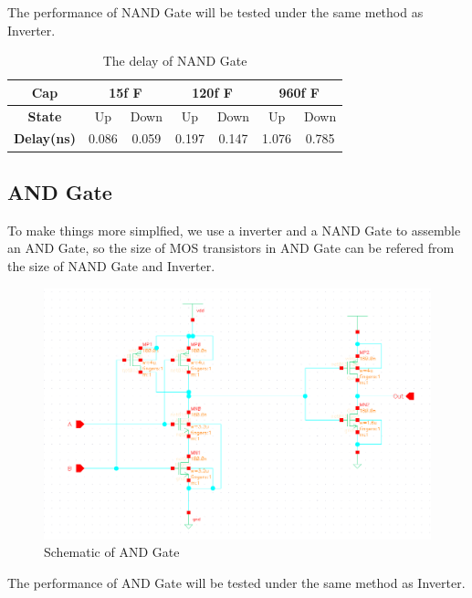 \documentclass[conference]{IEEEtran}
\begin{document}
The performance of NAND Gate will be tested under the same method as Inverter.

\begin{table}[h]
    \caption{The delay of NAND Gate}
    \begin{center}
        \begin{tabular}{|c|c|c|c|c|c|c|}
            \hline
            \textbf{Cap} & \multicolumn{2}{|c|}{15f F} & \multicolumn{2}{|c|}{120f F} & \multicolumn{2}{|c|}{960f F} \\
            \hline
            \textbf{State} & Up & Down & Up & Down & Up & Down \\
            \hline
            \textbf{Delay(ns)} & 0.086 & 0.059 & 0.197 & 0.147 & 1.076 & 0.785 \\
            \hline
        \end{tabular}
    \end{center}
    \label{The delay of NAND}
\end{table}

\subsection{AND Gate}

To make things more simplfied, we use a inverter and a NAND Gate to assemble an AND Gate, so the size of MOS transistors in AND Gate can be refered from the size of NAND Gate and Inverter.

\begin{figure}[H]
    \centering
    \includegraphics[width = 0.9\linewidth]{and2_schematic.png}
    \caption{Schematic of AND Gate}
    \label{Schematic of AND Gate}
\end{figure}

The performance of AND Gate will be tested under the same method as Inverter.
\end{document}
